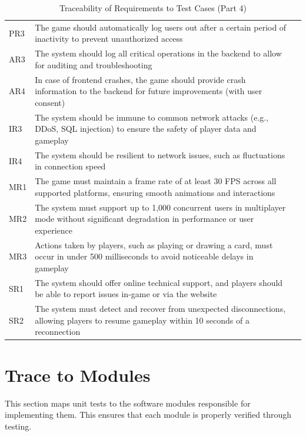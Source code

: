 \documentclass[12pt, titlepage]{article}
\begin{document}
\begin{table}[H]
    \centering
    \begin{tabularx}{\textwidth}{|l|X|l|}
        \hline
        PR3 & The game should automatically log users out after a certain period of inactivity to prevent unauthorized access &  \\
        AR3 & The system should log all critical operations in the backend to allow for auditing and troubleshooting &  \\
        AR4 & In case of frontend crashes, the game should provide crash information to the backend for future improvements (with user consent) &  \\
        IR3 & The system should be immune to common network attacks (e.g., DDoS, SQL injection) to ensure the safety of player data and gameplay &  \\
        IR4 & The system should be resilient to network issues, such as fluctuations in connection speed &  \\
        MR1 & The game must maintain a frame rate of at least 30 FPS across all supported platforms, ensuring smooth animations and interactions &  \\
        MR2 & The system must support up to 1,000 concurrent users in multiplayer mode without significant degradation in performance or user experience &  \\
        MR3 & Actions taken by players, such as playing or drawing a card, must occur in under 500 milliseconds to avoid noticeable delays in gameplay &  \\
        SR1 & The system should offer online technical support, and players should be able to report issues in-game or via the website &  \\
        SR2 & The system must detect and recover from unexpected disconnections, allowing players to resume gameplay within 10 seconds of a reconnection &  \\
        \hline
    \end{tabularx}
    \caption{Traceability of Requirements to Test Cases (Part 4)}
    \label{tab:trace_requirements_4}
\end{table}





\section{Trace to Modules}
This section maps unit tests to the software modules responsible for implementing them. This ensures that each module is properly verified through testing.
\end{document}
